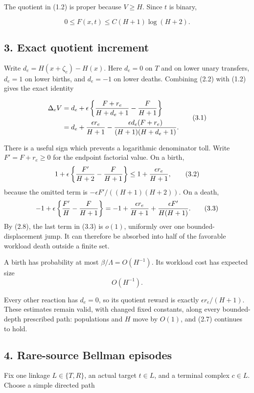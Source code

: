 The quotient in (1.2) is proper because \(V\ge H\). Since \(t\) is
binary,

\[
                  0\le F(x,t)\le C(H+1)\log(H+2).       \tag{2.8}
\]

\subsection{3. Exact quotient increment}

Write \(d_e=H(x+\zeta_e)-H(x)\). Here \(d_e=0\) on \(T\) and on lower
unary transfers, \(d_e=1\) on lower births, and \(d_e=-1\) on lower
deaths. Combining (2.2) with (1.2) gives the exact identity

\[
\begin{aligned}
 \Delta_eV
 &=d_e+\epsilon\left\{{F+r_e\over H+d_e+1}-{F\over H+1}\right\}\\
 &=d_e+{\epsilon r_e\over H+1}
   -{\epsilon d_e(F+r_e)\over(H+1)(H+d_e+1)} .
\end{aligned}
\tag{3.1}
\]

There is a useful sign which prevents a logarithmic denominator toll.
Write \(F'=F+r_e\ge0\) for the endpoint factorial value. On a birth, \[
 1+\epsilon\left\{{F'\over H+2}-{F\over H+1}\right\}
 \le 1+{\epsilon r_e\over H+1},                       \tag{3.2}
\] because the omitted term is \(-\epsilon F'/((H+1)(H+2))\). On a
death, \[
 -1+\epsilon\left\{{F'\over H}-{F\over H+1}\right\}
 =-1+{\epsilon r_e\over H+1}
             +{\epsilon F'\over H(H+1)}.              \tag{3.3}
\] By (2.8), the last term in (3.3) is \(o(1)\), uniformly over one
bounded-displacement jump. It can therefore be absorbed into half of the
favorable workload death outside a finite set.

A birth has probability at most \(\beta/\Lambda=O(H^{-1})\). Its
workload cost has expected size \[
                              O(H^{-1}).                \tag{3.4}
\]

Every other reaction has \(d_e=0\), so its quotient reward is exactly
\(\epsilon r_e/(H+1)\). These estimates remain valid, with changed fixed
constants, along every bounded-depth prescribed path: populations and
\(H\) move by \(O(1)\), and (2.7) continues to hold.

\subsection{4. Rare-source Bellman
episodes}

Fix one linkage \(L\in\{T,R\}\), an actual target \(t\in L\), and a
terminal complex \(c\in L\). Choose a simple directed path

